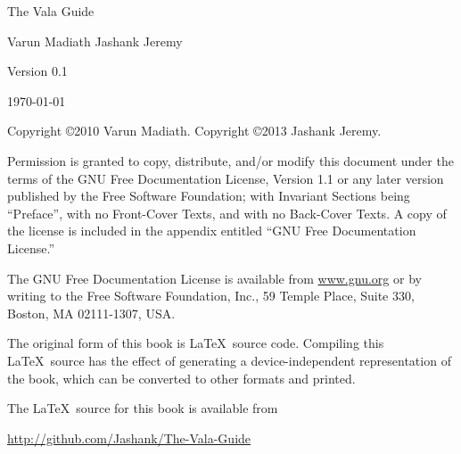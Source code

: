 \documentclass[openany]{book}
\begin{document}
\pagebreak
\thispagestyle{empty}

\begin{flushright}
\vspace*{2.5in}

{\Huge The Vala Guide}

\vspace{1in}

{\Large
Varun Madiath
Jashank Jeremy
}


\vspace{1in}

{\Large Version 0.1}

{\small \today}

\vfill

\end{flushright}

\pagebreak
\thispagestyle{empty}

Copyright \copyright 2010 Varun Madiath.
Copyright \copyright 2013 Jashank Jeremy.

\vspace{0.25in}

Permission is granted to copy, distribute, and/or modify this document
under the terms of the GNU Free Documentation License, Version 1.1 or
any later version published by the Free Software Foundation; with
Invariant Sections being ``Preface'', with no Front-Cover Texts, and
with no Back-Cover Texts.  A copy of the license is included in the
appendix entitled ``GNU Free Documentation License.''

The GNU Free Documentation License is available from \url{www.gnu.org}
or by writing to the Free Software Foundation, Inc., 59 Temple Place,
Suite 330, Boston, MA 02111-1307, USA.

The original form of this book is \LaTeX\ source code.  Compiling this
\LaTeX\ source has the effect of generating a device-independent
representation of the book, which can be converted to other formats
and printed.

The \LaTeX\ source for this book is available from

\hspace{0.25in}\url{http://github.com/Jashank/The-Vala-Guide}

\vspace{0.25in}

\fontsize{12pt}{18pt}\selectfont
\tableofcontents



\end{document}
